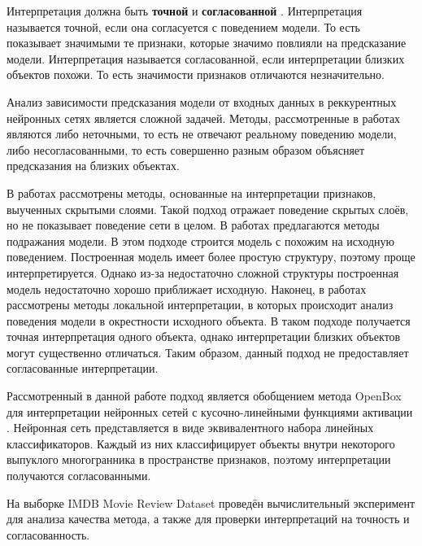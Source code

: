 \documentclass[12pt]{article}
\begin{document}
Интерпретация должна быть \textbf{точной} и \textbf{согласованной} \cite{chu2019exact}. Интерпретация называется точной, если она согласуется с поведением модели. То есть показывает значимыми те признаки, которые значимо повлияли на предсказание модели. Интерпретация называется согласованной, если интерпретации близких объектов похожи. То есть значимости признаков отличаются незначительно.

Анализ зависимости предсказания модели от входных данных в реккурентных нейронных сетях является сложной задачей. Методы, рассмотренные в работах \cite{dosovitskiy2016inverting, zhou2018interpreting, NIPS2014_ea8fcd92, bastani2019interpreting, zhou2015learning, simonyan2014deep} являются либо неточными, то есть не отвечают реальному поведению модели, либо несогласованными, то есть совершенно разным образом объясняет предсказания на близких объектах.

В работах \cite{dosovitskiy2016inverting, zhou2018interpreting} рассмотрены методы, основанные на интерпретации признаков, выученных скрытыми слоями. Такой подход отражает поведение скрытых слоёв, но не показывает поведение сети в целом. В работах \cite{NIPS2014_ea8fcd92, bastani2019interpreting} предлагаются методы подражания модели. В этом подходе строится модель с похожим на исходную поведением. Построенная модель имеет более простую структуру, поэтому проще интерпретируется. Однако из-за недостаточно сложной структуры построенная модель недостаточно хорошо приближает исходную. Наконец, в работах \cite{zhou2015learning, simonyan2014deep} рассмотрены методы локальной интерпретации, в которых происходит анализ поведения модели в окрестности исходного объекта. В таком подходе получается точная интерпретация одного объекта, однако интерпретации близких объектов могут существенно отличаться. Таким образом, данный подход не предоставляет согласованные интерпретации.

Рассмотренный в данной работе подход является обобщением метода OpenBox для интерпретации нейронных сетей с кусочно-линейными  функциями активации \cite{chu2019exact}. Нейронная сеть представляется в виде эквивалентного набора линейных классификаторов. Каждый из них классифицирует объекты внутри некоторого выпуклого многогранника в пространстве признаков, поэтому интерпретации получаются согласованными.

На выборке IMDB Movie Review Dataset \cite{maas-EtAl:2011:ACL-HLT2011} проведён вычислительный эксперимент для анализа качества метода, а также для проверки интерпретаций на точность и согласованность. 
\end{document}
